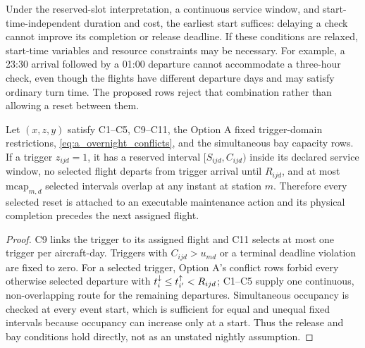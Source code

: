 Under the reserved-slot interpretation, a continuous service window, and
start-time-independent duration and cost, the earliest start suffices:
delaying a check cannot improve its completion or release deadline. If
these conditions are relaxed, start-time variables and resource constraints
may be necessary. For example, a 23:30 arrival followed by a 01:00 departure
cannot accommodate a three-hour check, even though the flights have
different departure days and may satisfy ordinary turn time. The proposed
rows reject that combination rather than allowing a reset between them.

\begin{proposition}
  Let $(x,z,y)$ satisfy C1--C5, C9--C11, the Option A fixed trigger-domain
  restrictions, \eqref{eq:a_overnight_conflicts}, and the simultaneous bay
  capacity rows. If a trigger $z_{ijd}=1$, it has a reserved interval
  $[S_{ijd},C_{ijd})$ inside its declared service window, no selected flight
  departs from trigger arrival until $R_{ijd}$, and at most
  $\mathrm{mcap}_{m,d}$ selected intervals overlap at any instant at station
  $m$. Therefore every selected reset is attached to an executable maintenance
  action and its physical completion precedes the next assigned flight.
\end{proposition}

\begin{proof}
  C9 links the trigger to its assigned flight and C11 selects at most one
  trigger per aircraft-day. Triggers with $C_{ijd}>u_{md}$ or a terminal
  deadline violation are fixed to zero. For a selected trigger, Option A's
  conflict rows forbid every otherwise selected departure with
  $t^{\downarrow}_{i}\le t^{\uparrow}_{i'}<R_{ijd}$; C1--C5 supply one continuous, non-overlapping
  route for the remaining departures. Simultaneous occupancy is checked at
  every event start, which is sufficient for equal and unequal fixed intervals
  because occupancy can increase only at a start. Thus the release and bay
  conditions hold directly, not as an unstated nightly assumption.
\end{proof}

